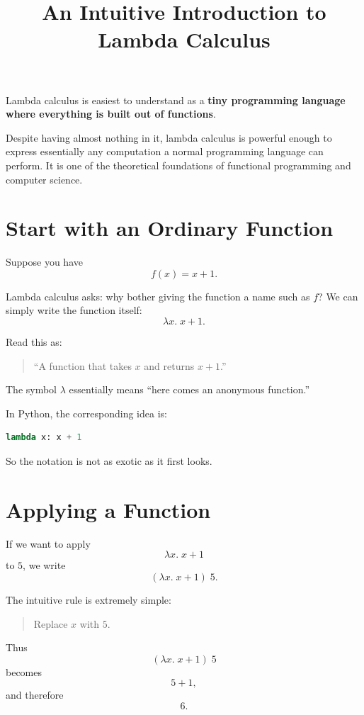 \documentclass[11pt]{article}
\title{An Intuitive Introduction to Lambda Calculus}
\author{}
\date{}
\begin{document}
\maketitle

Lambda calculus is easiest to understand as a \textbf{tiny programming
language where everything is built out of functions}.

Despite having almost nothing in it, lambda calculus is powerful enough
to express essentially any computation a normal programming language
can perform. It is one of the theoretical foundations of functional
programming and computer science.

\section{Start with an Ordinary Function}

Suppose you have
\[
f(x)=x+1.
\]

Lambda calculus asks: why bother giving the function a name such as
\(f\)? We can simply write the function itself:
\[
\lambda x.\;x+1.
\]

Read this as:

\begin{quote}
``A function that takes \(x\) and returns \(x+1\).''
\end{quote}

The symbol \(\lambda\) essentially means ``here comes an anonymous
function.''

In Python, the corresponding idea is:

\begin{lstlisting}[language=Python]
lambda x: x + 1
\end{lstlisting}

So the notation is not as exotic as it first looks.

\section{Applying a Function}

If we want to apply
\[
\lambda x.\;x+1
\]
to \(5\), we write
\[
(\lambda x.\;x+1)\;5.
\]

The intuitive rule is extremely simple:

\begin{quote}
Replace \(x\) with \(5\).
\end{quote}

Thus
\[
(\lambda x.\;x+1)\;5
\]
becomes
\[
5+1,
\]
and therefore
\[
6.
\]
\end{document}
